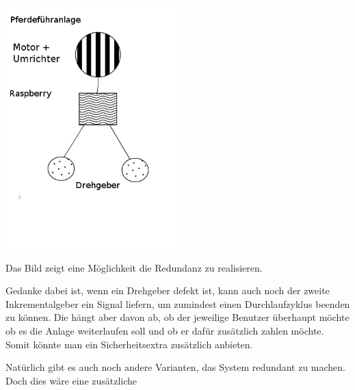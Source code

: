 \documentclass[12pt]{scrreprt} %
\begin{document}
\begin{center}
	\includegraphics[width=0.5\textwidth]{Redundanz}
\end{center}

Das Bild zeigt eine Möglichkeit die Redundanz zu realisieren.

Gedanke dabei ist, wenn ein Drehgeber defekt ist, kann auch noch der zweite Inkrementalgeber ein Signal liefern, um zumindest einen Durchlaufzyklus beenden zu können. Die hängt aber davon ab, ob der jeweilige Benutzer überhaupt möchte ob es die Anlage weiterlaufen soll und ob er dafür zusätzlich zahlen möchte. Somit könnte man ein Sicherheitsextra zusätzlich anbieten.

Natürlich gibt es auch noch andere Varianten, das System redundant zu machen. Doch dies wäre eine zusätzliche 
\end{document}

